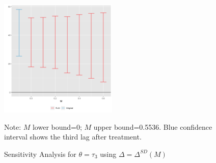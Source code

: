 \documentclass{beamer}
\begin{document}
\begin{frame}[label=sensitivity_analysis, noframenumbering]
 
 \begin{figure}[!htbp]  
\centering
\caption{Sensitivity Analysis for $\theta=\tau_3$ using $\Delta = \Delta^{SD}(M)$} 
\label{fig:pretrends_sensitivity}
 
\includegraphics[width=0.5\textwidth]{Figures_pres/pretrends_sensitivity.png}
       \captionsetup{justification=centering}
\bigskip   
 
{\footnotesize Note: $M$ lower bound=0; $M$ upper bound=0.5536. Blue confidence interval shows the third lag after treatment.} 
 \\  
  \hyperlink{robustness}{}  
\end{figure} 
\end{frame}
\end{document}
